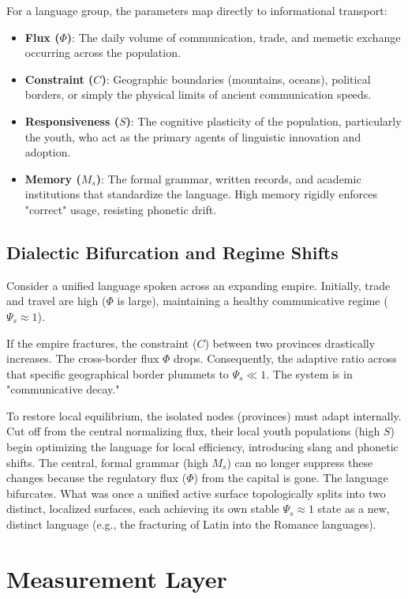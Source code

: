 \documentclass[11pt,a4paper]{article}
\begin{document}
For a language group, the parameters map directly to informational transport:
\begin{itemize}
    \item \textbf{Flux ($\Phi$)}: The daily volume of communication, trade, and memetic exchange occurring across the population.
    \item \textbf{Constraint ($C$)}: Geographic boundaries (mountains, oceans), political borders, or simply the physical limits of ancient communication speeds.
    \item \textbf{Responsiveness ($S$)}: The cognitive plasticity of the population, particularly the youth, who act as the primary agents of linguistic innovation and adoption.
    \item \textbf{Memory ($M_s$)}: The formal grammar, written records, and academic institutions that standardize the language. High memory rigidly enforces "correct" usage, resisting phonetic drift.
\end{itemize}

\subsection{Dialectic Bifurcation and Regime Shifts}
Consider a unified language spoken across an expanding empire. Initially, trade and travel are high ($\Phi$ is large), maintaining a healthy communicative regime ($\Psi_s \approx 1$).

If the empire fractures, the constraint ($C$) between two provinces drastically increases. The cross-border flux $\Phi$ drops. Consequently, the adaptive ratio across that specific geographical border plummets to $\Psi_s \ll 1$. The system is in "communicative decay."

To restore local equilibrium, the isolated nodes (provinces) must adapt internally. Cut off from the central normalizing flux, their local youth populations (high $S$) begin optimizing the language for local efficiency, introducing slang and phonetic shifts. The central, formal grammar (high $M_s$) can no longer suppress these changes because the regulatory flux ($\Phi$) from the capital is gone. The language bifurcates. What was once a unified active surface topologically splits into two distinct, localized surfaces, each achieving its own stable $\Psi_s \approx 1$ state as a new, distinct language (e.g., the fracturing of Latin into the Romance languages).



\section{Measurement Layer}
\end{document}
